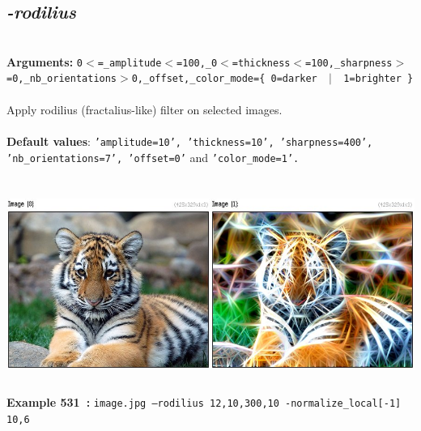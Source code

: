 \documentclass[a4paper,11pt,twoside]{book}
\begin{document}
\subsection{\emph{-rodilius} }\vspace*{-0.5em}
~\\\textbf{Arguments: } 
{\small \texttt{0$<$=\_amplitude$<$=100,\_0$<$=thickness$<$=100,\_sharpness$>$=0,\_nb\_orientations$>$0,\_offset,\_color\_mode=\{ 0=darker ~$|$~ 1=brighter \}}}\\~\\
Apply rodilius (fractalius-like) filter on selected images.
~\\~\\\textbf{Default values}: {\small \texttt{'amplitude=10', 'thickness=10', 'sharpness=400', 'nb\_orientations=7', 'offset=0'} and \texttt{'color\_mode=1'.}}
\begin{center}\includegraphics[keepaspectratio=true,height=7cm,width=\textwidth]{img/gmic_def531.jpg}\\
{\footnotesize \textbf{Example 531~:} \texttt{image.jpg --rodilius 12,10,300,10 -normalize\_local[-1] 10,6}}
\end{center}
\end{document}
